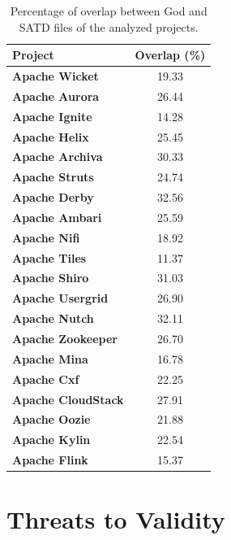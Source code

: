 {\begin{table}[!htbp]
	\quad \quad \quad
	\begin{tabular}{l|c}
		\hline
		\textbf{Project}           & \textbf{Overlap (\%)} \\ \hline
		\textbf{Apache Wicket}     &    19.33     \\ \hline
		\textbf{Apache Aurora}     &    26.44     \\ \hline
		\textbf{Apache Ignite}     &    14.28     \\ \hline
		\textbf{Apache Helix}      &    25.45     \\ \hline
		\textbf{Apache Archiva}    &    30.33     \\ \hline
		\textbf{Apache Struts}     &    24.74     \\ \hline
		\textbf{Apache Derby}      &    32.56     \\ \hline
		\textbf{Apache Ambari}     &    25.59     \\ \hline
		\textbf{Apache Nifi}       &    18.92     \\ \hline
		\textbf{Apache Tiles}      &    11.37     \\ \hline
		\textbf{Apache Shiro}      &    31.03     \\ \hline
		\textbf{Apache Usergrid}   &    26.90     \\ \hline
		\textbf{Apache Nutch}      &    32.11     \\ \hline
		\textbf{Apache Zookeeper}  &    26.70     \\ \hline
		\textbf{Apache Mina}       &    16.78     \\ \hline
		\textbf{Apache Cxf}        &    22.25     \\ \hline
		\textbf{Apache CloudStack} &    27.91     \\ \hline
		\textbf{Apache Oozie}      &    21.88     \\ \hline
		\textbf{Apache Kylin}      &    22.54     \\ \hline
		\textbf{Apache Flink}      &    15.37     \\ \hline
	\end{tabular}
	\caption{Percentage of overlap between God and SATD files of the analyzed projects.}
	\label{ch4_amount_of_overlap}
\end{table}

\pagebreak



\section{Threats to Validity}
\label{chap4:sec:threats_to_validity}


}
